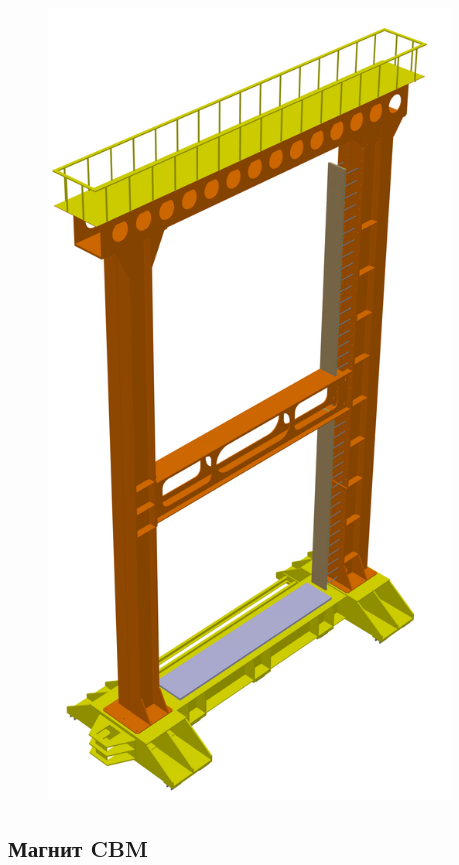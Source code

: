\begin{figure}[H]
\begin{minipage}[b]{0.31\textwidth}
\includegraphics[width=0.95\textwidth]{pictures/ECAL_SIS300_CATIA_cad.png}
\caption{}
\label{fig:CbmEcal3}
\end{minipage}
\end{figure}

\subsection{Магнит CBM}

